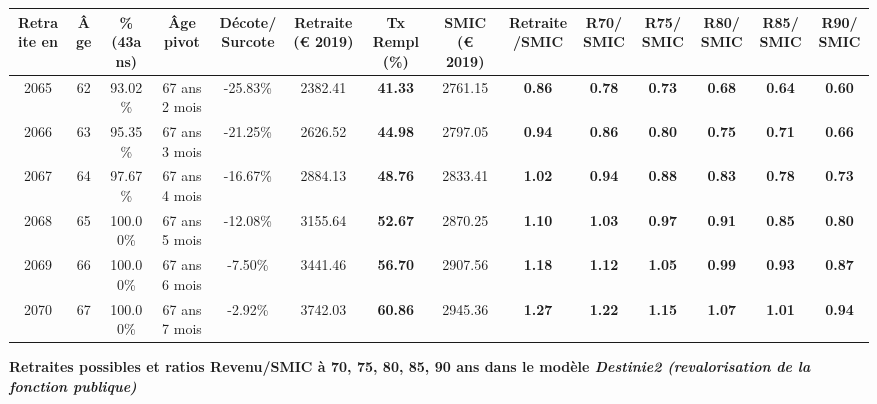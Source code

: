 \begin{adjustbox}{max width=\textwidth} 
\begin{tabular}[htb]{|c|c||c|c|c||c|c||c|c||c|c|c|c|c|} 
\hline 
 Retraite en &  Âge &  \%(43ans) &  Âge pivot &  Décote/Surcote &  Retraite (\euro{} 2019) &  Tx Rempl(\%) &  SMIC (\euro{} 2019) &  Retraite/SMIC &  R70/SMIC &  R75/SMIC &  R80/SMIC &  R85/SMIC &  R90/SMIC \\ 
\hline \hline 
 2065 &  62 &  93.02\% &  67 ans 2 mois &  -25.83\% &  2382.41 &  {\bf 41.33} &  2761.15 &  {\bf {\color{red} 0.86}} &  {\bf {\color{red} 0.78}} &  {\bf {\color{red} 0.73}} &  {\bf {\color{red} 0.68}} &  {\bf {\color{red} 0.64}} &  {\bf {\color{red} 0.60}} \\ 
\hline 
 2066 &  63 &  95.35\% &  67 ans 3 mois &  -21.25\% &  2626.52 &  {\bf 44.98} &  2797.05 &  {\bf {\color{red} 0.94}} &  {\bf {\color{red} 0.86}} &  {\bf {\color{red} 0.80}} &  {\bf {\color{red} 0.75}} &  {\bf {\color{red} 0.71}} &  {\bf {\color{red} 0.66}} \\ 
\hline 
 2067 &  64 &  97.67\% &  67 ans 4 mois &  -16.67\% &  2884.13 &  {\bf 48.76} &  2833.41 &  {\bf 1.02} &  {\bf {\color{red} 0.94}} &  {\bf {\color{red} 0.88}} &  {\bf {\color{red} 0.83}} &  {\bf {\color{red} 0.78}} &  {\bf {\color{red} 0.73}} \\ 
\hline 
 2068 &  65 &  100.00\% &  67 ans 5 mois &  -12.08\% &  3155.64 &  {\bf 52.67} &  2870.25 &  {\bf 1.10} &  {\bf 1.03} &  {\bf {\color{red} 0.97}} &  {\bf {\color{red} 0.91}} &  {\bf {\color{red} 0.85}} &  {\bf {\color{red} 0.80}} \\ 
\hline 
 2069 &  66 &  100.00\% &  67 ans 6 mois &  -7.50\% &  3441.46 &  {\bf 56.70} &  2907.56 &  {\bf 1.18} &  {\bf 1.12} &  {\bf 1.05} &  {\bf {\color{red} 0.99}} &  {\bf {\color{red} 0.93}} &  {\bf {\color{red} 0.87}} \\ 
\hline 
 2070 &  67 &  100.00\% &  67 ans 7 mois &  -2.92\% &  3742.03 &  {\bf 60.86} &  2945.36 &  {\bf 1.27} &  {\bf 1.22} &  {\bf 1.15} &  {\bf 1.07} &  {\bf 1.01} &  {\bf {\color{red} 0.94}} \\ 
\hline 
\hline 
\end{tabular} 
\end{adjustbox} 
 
 \vspace{0.1cm} 
{\bf \noindent Retraites possibles et ratios Revenu/SMIC à 70, 75, 80, 85, 90 ans dans le modèle \emph{Destinie2 (revalorisation de la fonction publique)}}  
 
